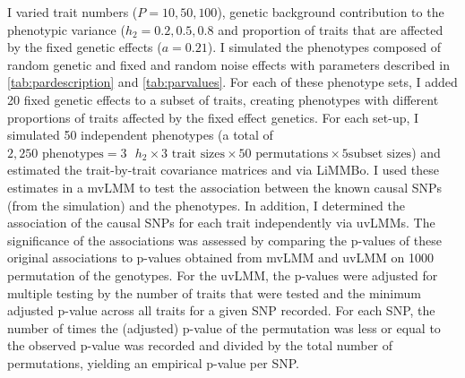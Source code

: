 I varied trait numbers (\(P={10,50,100}\)), genetic background contribution to the phenotypic variance (\(h_2={0.2,0.5,0.8}\) and proportion of traits that are affected by the fixed genetic effects (\(a={0.2}{1}\)). I simulated the phenotypes composed of random genetic and fixed and random noise effects with parameters described in \cref{tab:pardescription} and \cref{tab:parvalues}. For each of these phenotype sets, I added \num{20} fixed genetic effects to a subset of traits, creating phenotypes with different proportions of traits affected by the fixed effect genetics.  For each set-up, I simulated \num{50} independent phenotypes (a total of \( 2,250 \text{ phenotypes} = 3\text{ }h_2 \times 3 \text{ trait sizes} \times 50 \text{ permutations} \times 5 \text{subset sizes}\)) and estimated the trait-by-trait covariance matrices  and  via LiMMBo. I used these estimates in a mvLMM to test the association between the known causal SNPs (from the simulation) and the phenotypes. In addition, I determined the association of the causal SNPs for each trait independently via uvLMMs. The significance of the associations was assessed by comparing the p-values of these original associations to p-values obtained from mvLMM and uvLMM on \num{1000} permutation of the genotypes.  For the uvLMM,  the p-values were adjusted for multiple testing by the number of traits that were tested and the minimum adjusted p-value across all traits for a given SNP recorded. For each SNP, the number of times the (adjusted) p-value of the permutation was less or equal to the observed p-value was recorded and divided by the total number of permutations, yielding an empirical p-value per SNP.

